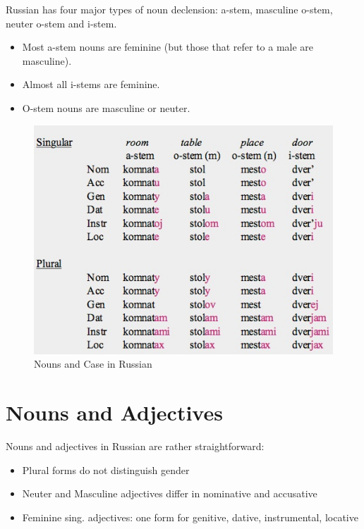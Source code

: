 \documentclass[
  a4paperpaper,
]{report}
\providecommand{\tightlist}{%
  \setlength{\itemsep}{0pt}\setlength{\parskip}{0pt}}
\begin{document}
Russian has four major types of noun declension: a-stem, masculine
o-stem, neuter o-stem and i-stem.

\begin{itemize}
\tightlist
\item
  Most a-stem nouns are feminine (but those that refer to a male are
  masculine).
\item
  Almost all i-stems are feminine.
\item
  O-stem nouns are masculine or neuter.
\end{itemize}

\begin{figure}
\centering
\includegraphics{./casedec.jpg}
\caption{Nouns and Case in Russian}
\end{figure}

\hypertarget{nouns-and-adjectives}{%
\section{Nouns and Adjectives}\label{nouns-and-adjectives}}

Nouns and adjectives in Russian are rather straightforward:

\begin{itemize}
\tightlist
\item
  Plural forms do not distinguish gender
\item
  Neuter and Masculine adjectives differ in nominative and accusative
\item
  Feminine sing. adjectives: one form for genitive, dative,
  instrumental, locative
\end{itemize}
\end{document}
